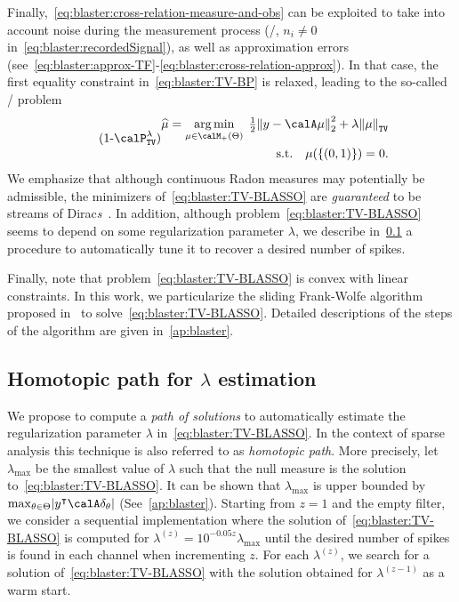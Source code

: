 \mynewline
Finally,~\cref{eq:blaster:cross-relation-measure-and-obs} can be exploited to take into account noise during the measurement process (\ie/,  $n_i\neq0$ in~\cref{eq:blaster:recordedSignal}), as well as approximation errors  (see~\cref{eq:blaster:approx-TF}-\cref{eq:blaster:cross-relation-approx}).
In that case, the first equality constraint in~\eqref{eq:blaster:TV-BP} is relaxed, leading to the so-called \BLASSO/ problem
\begin{equation}
    \stepcounter{equation}
    \tag{\theequation-$\calP^\lambda_{\text{\texttt{TV}}}$}
    \label{eq:blaster:TV-BLASSO}
    \begin{split}
    \widehat{\mu}
    =
    \kargmin_{\mu \in\posDisRadonMeasure}
    \;
    \tfrac{1}{2} \kvvbar{
        y - \opObs\mu
    }_2^2
    +
    \lambda\normTV{
        \mu
    }
    \\
    \quad
    \text{s.t.}
    \quad
    \mu(\{(0, 1)\}) = 0
    .
    \end{split}
\end{equation}
We emphasize that although continuous Radon measures may potentially be admissible, the minimizers of~\cref{eq:blaster:TV-BLASSO} are \emph{guaranteed} to be streams of Dirac\textit{s}~.
In addition, although problem~\cref{eq:blaster:TV-BLASSO} seems to depend on some regularization parameter $\lambda$, we describe in~\cref{sec:blaster:lambda} a procedure to automatically tune it to recover a desired number of spikes.

\mynewline
Finally, note that problem~\cref{eq:blaster:TV-BLASSO} is convex with linear constraints.
In this work, we particularize the sliding Frank-Wolfe algorithm proposed in~ to solve~\cref{eq:blaster:TV-BLASSO}.
Detailed descriptions of the steps of the algorithm are given in~\cref{ap:blaster}.

\subsection{Homotopic path for $\lambda$ estimation}\label{sec:blaster:lambda}
We propose to compute a \textit{path of solutions} to automatically estimate the regularization parameter $\lambda$  in~\cref{eq:blaster:TV-BLASSO}.
In the context of sparse analysis this technique is also referred to as \textit{homotopic path}.
More precisely, let $\lambda_{\max}$ be the smallest value of $\lambda$ such that the null measure is the solution to~\cref{eq:blaster:TV-BLASSO}.
It can be shown that $\lambda_{\max}$ is upper bounded by $\max_{\theta\in\Theta} \kvbar{y^\intercal\opObs\delta_\theta}$ (See~\cref{ap:blaster}).
Starting from $z=1$ and the empty filter, we consider a sequential implementation where the solution of~\cref{eq:blaster:TV-BLASSO} is computed for $\lambda^(z)= 10^{-0.05z}\lambda_{\max}$ until the desired number of spikes is found in each channel when incrementing $z$.
For each $\lambda^(z)$, we search for a solution of~\cref{eq:blaster:TV-BLASSO} with the solution obtained for $\lambda^{(z-1)}$ as a warm start.


